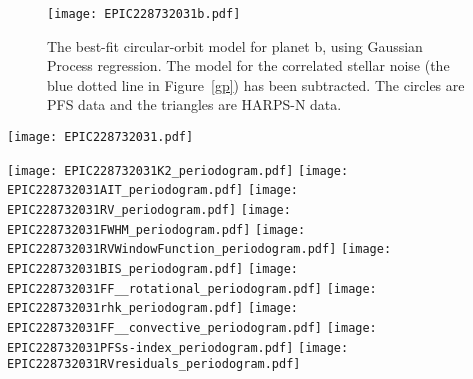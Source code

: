 \documentclass[twocolumn]{aastex61}
\begin{document}
\begin{figure}
\begin{center}
\texttt{[image: EPIC228732031b.pdf]}
\caption{The best-fit circular-orbit model for planet b, using Gaussian Process regression. The model for the correlated stellar noise (the blue dotted line in Figure~\ref{gp}) has been subtracted. The circles are PFS data and the triangles are HARPS-N data.}
\label{gp_fold}
\end{center}
\end{figure}


\begin{figure*}
\begin{center}
\texttt{[image: EPIC228732031.pdf]}
\caption{The measured radial velocity variation of EPIC~228732031 and the best-fit Gaussian Process
model. The circles are PFS data and the triangles are HARPS-N data. The red solid line is the best-fit model including the signal of planet b and the correlated stellar noise. The yellow dashed line is the
signal of planet b. The blue dotted line is the Gaussian Process.}
\label{gp}
\end{center}
\end{figure*}




\begin{figure*}
\begin{center}
\texttt{[image: EPIC228732031K2\_periodogram.pdf]}
\texttt{[image: EPIC228732031AIT\_periodogram.pdf]}
\texttt{[image: EPIC228732031RV\_periodogram.pdf]}
\texttt{[image: EPIC228732031FWHM\_periodogram.pdf]}
\texttt{[image: EPIC228732031RVWindowFunction\_periodogram.pdf]}
\texttt{[image: EPIC228732031BIS\_periodogram.pdf]}
\texttt{[image: EPIC228732031FF\_\_rotational\_periodogram.pdf]}
\texttt{[image: EPIC228732031rhk\_periodogram.pdf]}
\texttt{[image: EPIC228732031FF\_\_convective\_periodogram.pdf]}
\texttt{[image: EPIC228732031PFSs-index\_periodogram.pdf]}
\texttt{[image: EPIC228732031RVresiduals\_periodogram.pdf]}

\caption{Lomb-Scargle periodograms of the photometric data, RV data, and various activity indicators for EPIC~228732031. We also include the activity-induced RV variation predicted by $FF^\prime$ method \citep{Aigrain2012} and {\it K2} light curve. The red solid line is the orbital period of planet b. The orange dashed line is the stellar rotation period measured from the {\it K2} light curves and the purple dashed line is its first harmonic. The gray dashed line shows the power level for which the
false alarm probability is 0.001. The green dotted line is the strongest peak in the RV dataset near 3.0 days. Comparison with the activity-induced RV variation predicted by $FF^\prime$ method \citep{Aigrain2012} shows that 3.0-day periodicity is likely due to stellar activity.}
\label{periodograms}
\end{center}
\end{figure*}
\end{document}
